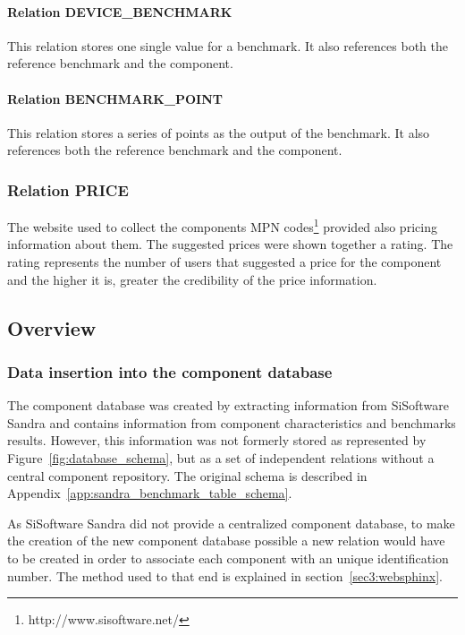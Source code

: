         \paragraph*{Relation DEVICE\_BENCHMARK}
            This relation stores one single value for a benchmark. It also references both the reference benchmark and the component.
            
        \paragraph*{Relation BENCHMARK\_POINT}
            This relation stores a series of points as the output of the benchmark. It also references both the reference benchmark and the component.            

    \subsubsection*{Relation PRICE}
        The website used to collect the components MPN codes\footnote{http://www.sisoftware.net/} provided also pricing information about them. The suggested prices were shown together a rating. The rating represents the number of users that suggested a price for the component and the higher it is, greater the credibility of the price information.
                        
\subsection{Overview} \label{sec4:analysis_overview}
    \subsubsection*{Data insertion into the component database}
        The component database was created by extracting information from SiSoftware Sandra and contains information from component characteristics and benchmarks results. However, this information was not formerly stored as represented by Figure~\ref{fig:database_schema}, but as a set of independent relations without a central component repository. The original schema is described in Appendix~\ref{app:sandra_benchmark_table_schema}.
    
        As SiSoftware Sandra did not provide a centralized component database, to make the creation of the new component database possible a new relation would have to be created in order to associate each component with an unique identification number. The method used to that end is explained in section~\ref{sec3:websphinx}.
    
